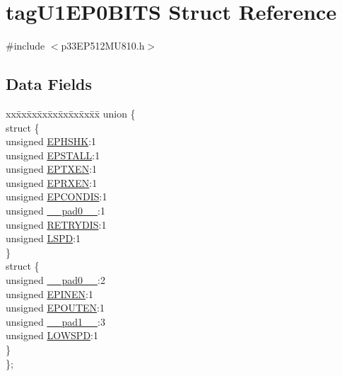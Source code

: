 \hypertarget{structtag_u1_e_p0_b_i_t_s}{}\section{tag\+U1\+E\+P0\+B\+I\+TS Struct Reference}
\label{structtag_u1_e_p0_b_i_t_s}


{\ttfamily \#include $<$p33\+E\+P512\+M\+U810.\+h$>$}

\subsection*{Data Fields}
\begin{DoxyCompactItemize}
\item 
\begin{tabbing}
xx\=xx\=xx\=xx\=xx\=xx\=xx\=xx\=xx\=\kill
union \{\\
\>struct \{\\
\>\>unsigned \hyperlink{structtag_u1_e_p0_b_i_t_s_a0d06430217cb4b189fbe9d0c4b460482}{EPHSHK}:1\\
\>\>unsigned \hyperlink{structtag_u1_e_p0_b_i_t_s_a47042104f04ebe06a23f9789bd400d7e}{EPSTALL}:1\\
\>\>unsigned \hyperlink{structtag_u1_e_p0_b_i_t_s_aa2d88c1be513e759c136823c86a355b4}{EPTXEN}:1\\
\>\>unsigned \hyperlink{structtag_u1_e_p0_b_i_t_s_a8a388d32ceffb87230e660b6793f2857}{EPRXEN}:1\\
\>\>unsigned \hyperlink{structtag_u1_e_p0_b_i_t_s_a1bd26df05d2b5a11b20ee548fce90c3e}{EPCONDIS}:1\\
\>\>unsigned \hyperlink{structtag_u1_e_p0_b_i_t_s_adf71f3d8410c1f1dbbc96680a92c49af}{\_\_pad0\_\_}:1\\
\>\>unsigned \hyperlink{structtag_u1_e_p0_b_i_t_s_a2d6c1715d6e66bbdc0898f60b4e641ba}{RETRYDIS}:1\\
\>\>unsigned \hyperlink{structtag_u1_e_p0_b_i_t_s_a02f095ee7c2d2a9b5485940da3f8702a}{LSPD}:1\\
\>\} \\
\>struct \{\\
\>\>unsigned \hyperlink{structtag_u1_e_p0_b_i_t_s_adf71f3d8410c1f1dbbc96680a92c49af}{\_\_pad0\_\_}:2\\
\>\>unsigned \hyperlink{structtag_u1_e_p0_b_i_t_s_a8b6d98cdf233ac90ff19d16d9a89215e}{EPINEN}:1\\
\>\>unsigned \hyperlink{structtag_u1_e_p0_b_i_t_s_adf87e8acfbb27a5626e21b3e3bd106fd}{EPOUTEN}:1\\
\>\>unsigned \hyperlink{structtag_u1_e_p0_b_i_t_s_acaf2d0924a107ec6e8d2e31febaf66f9}{\_\_pad1\_\_}:3\\
\>\>unsigned \hyperlink{structtag_u1_e_p0_b_i_t_s_a4d04bf7869e6f4b348ab4492a62ce69a}{LOWSPD}:1\\
\>\} \\
\}; \\

\end{tabbing}\end{DoxyCompactItemize}


